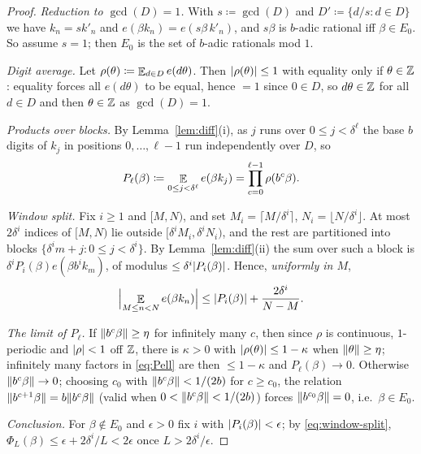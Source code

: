 \begin{proof}
  \leanok
  \emph{Reduction to $\gcd(D) = 1$.}  With $s \coloneqq \gcd(D)$ and
  $D' \coloneqq \{d/s : d \in D\}$ we have $k_n = s k'_n$ and $e(\beta k_n) = e(s\beta\, k'_n)$,
  and $s\beta$ is $b$-adic rational iff $\beta \in E_0$.  So assume $s = 1$; then $E_0$ is the
  set of $b$-adic rationals mod $1$.

  \emph{Digit average.}  Let $\rho(\theta) \coloneqq \mathop{\mathbb{E}}_{d \in D} e(d\theta)$.  Then
  $\lvert \rho(\theta) \rvert \leq 1$ with equality only if $\theta \in \mathbb{Z}$: equality forces all
  $e(d\theta)$ to be equal, hence $=1$ since $0 \in D$, so $d\theta \in \mathbb{Z}$ for all $d \in D$
  and then $\theta \in \mathbb{Z}$ as $\gcd(D) = 1$.

  \emph{Products over blocks.}  By Lemma~\ref{lem:diff}(i), as $j$ runs over $0 \leq j < \delta^\ell$
  the base $b$ digits of $k_j$ in positions $0,\dots,\ell-1$ run independently over $D$, so
  \begin{equation}
    \label{eq:Pell}
    P_\ell(\beta) \coloneqq \mathop{\mathbb{E}}_{0 \leq j < \delta^\ell} e(\beta k_j) = \prod_{c=0}^{\ell-1} \rho(b^c \beta) .
  \end{equation}

  \emph{Window split.}  Fix $i \geq 1$ and $[M,N)$, and set $M_i = \lceil M/\delta^i \rceil$,
  $N_i = \lfloor N/\delta^i \rfloor$.  At most $2\delta^i$ indices of $[M,N)$ lie outside
  $[\delta^i M_i, \delta^i N_i)$, and the rest are partitioned into blocks
  $\{\delta^i m + j : 0 \leq j < \delta^i\}$.  By Lemma~\ref{lem:diff}(ii) the sum over such a
  block is $\delta^i P_i(\beta) e(\beta b^i k_m)$, of modulus $\leq \delta^i \lvert P_i(\beta) \rvert$.
  Hence, \emph{uniformly in $M$},
  \begin{equation}
    \label{eq:window-split}
    \Bigl\lvert \mathop{\mathbb{E}}_{M \leq n < N} e(\beta k_n) \Bigr\rvert \leq \lvert P_i(\beta) \rvert + \frac{2\delta^i}{N-M} .
  \end{equation}

  \emph{The limit of $P_\ell$.}  If $\lVert b^c \beta \rVert \geq \eta$ for infinitely many $c$, then
  since $\rho$ is continuous, $1$-periodic and $\lvert \rho \rvert < 1$ off $\mathbb{Z}$, there is $\kappa > 0$
  with $\lvert \rho(\theta) \rvert \leq 1 - \kappa$ when $\lVert \theta \rVert \geq \eta$; infinitely many
  factors in \eqref{eq:Pell} are then $\leq 1 - \kappa$ and $P_\ell(\beta) \to 0$.
  Otherwise $\lVert b^c\beta \rVert \to 0$; choosing $c_0$ with $\lVert b^c\beta \rVert < 1/(2b)$ for
  $c \geq c_0$, the relation $\lVert b^{c+1}\beta \rVert = b\lVert b^c\beta \rVert$ (valid when
  $0 < \lVert b^c \beta \rVert < 1/(2b)$) forces $\lVert b^{c_0}\beta \rVert = 0$, i.e.\ $\beta \in E_0$.

  \emph{Conclusion.}  For $\beta \notin E_0$ and $\epsilon > 0$ fix $i$ with
  $\lvert P_i(\beta) \rvert < \epsilon$; by \eqref{eq:window-split},
  $\Phi_L(\beta) \leq \epsilon + 2\delta^i/L < 2\epsilon$ once $L > 2\delta^i/\epsilon$.
\end{proof}

